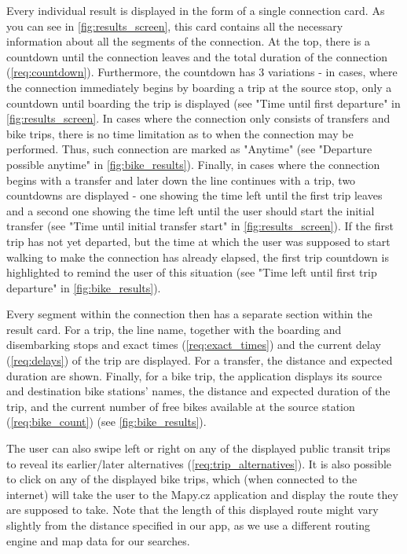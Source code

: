 Every individual result is displayed in the form of a single connection card. As you can see in \cref{fig:results_screen}, this card contains all the necessary information about all the segments of the connection. At the top, there is a countdown until the connection leaves and the total duration of the connection (\cref{req:countdown}). Furthermore, the countdown has 3 variations - in cases, where the connection immediately begins by boarding a trip at the source stop, only a countdown until boarding the trip is displayed (see "Time until first departure" in \cref{fig:results_screen}. In cases where the connection only consists of transfers and bike trips, there is no time limitation as to when the connection may be performed. Thus, such connection are marked as "Anytime" (see "Departure possible anytime" in \cref{fig:bike_results}). Finally, in cases where the connection begins with a transfer and later down the line continues with a trip, two countdowns are displayed - one showing the time left until the first trip leaves and a second one showing the time left until the user should start the initial transfer (see "Time until initial transfer start" in \cref{fig:results_screen}). If the first trip has not yet departed, but the time at which the user was supposed to start walking to make the connection has already elapsed, the first trip countdown is highlighted to remind the user of this situation (see "Time left until first trip departure" in \cref{fig:bike_results}).

Every segment within the connection then has a separate section within the result card. For a trip, the line name, together with the boarding and disembarking stops and exact times (\cref{req:exact_times}) and the current delay (\cref{req:delays}) of the trip are displayed. For a transfer, the distance and expected duration are shown. Finally, for a bike trip, the application displays its source and destination bike stations' names, the distance and expected duration of the trip, and the current number of free bikes available at the source station (\cref{req:bike_count}) (see \cref{fig:bike_results}).

The user can also swipe left or right on any of the displayed public transit trips to reveal its earlier/later alternatives (\cref{req:trip_alternatives}). It is also possible to click on any of the displayed bike trips, which (when connected to the internet) will take the user to the Mapy.cz application and display the route they are supposed to take. Note that the length of this displayed route might vary slightly from the distance specified in our app, as we use a different routing engine and map data for our searches.

